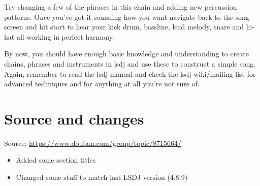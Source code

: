 \documentclass[]{article}
\begin{document}
Try changing a few of the phrases in this chain and adding new percussion patterns. Once you’ve got it sounding how you want navigate back to the song screen and hit start to hear your kick drum, bassline, lead melody, snare and hi-hat all working in perfect harmony.

By now, you should have enough basic knowledge and understanding to create chains, phrases and instruments in lsdj and use these to construct a simple song. Again, remember to read the lsdj manual and check the lsdj wiki/mailing list for advanced techniques and for anything at all you’re not sure of.


\section*{Source and changes}

Source: \url{https://www.douban.com/group/topic/8715664/}

\begin{itemize}
	\item Added some section titles
	\item Changed some stuff to match last LSDJ version (4.8.9)
\end{itemize}
\end{document}
